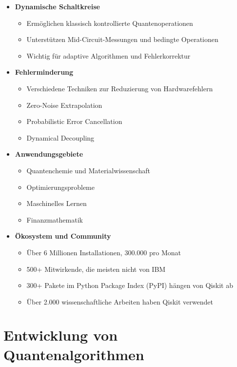 \begin{itemize}
    \item \textbf{Dynamische Schaltkreise}
    \begin{itemize}
        \item Ermöglichen klassisch kontrollierte Quantenoperationen
        \item Unterstützen Mid-Circuit-Messungen und bedingte Operationen
        \item Wichtig für adaptive Algorithmen und Fehlerkorrektur
    \end{itemize}
    
    \item \textbf{Fehlerminderung}
    \begin{itemize}
        \item Verschiedene Techniken zur Reduzierung von Hardwarefehlern
        \item Zero-Noise Extrapolation
        \item Probabilistic Error Cancellation
        \item Dynamical Decoupling
    \end{itemize}
    
    \item \textbf{Anwendungsgebiete}
    \begin{itemize}
        \item Quantenchemie und Materialwissenschaft
        \item Optimierungsprobleme
        \item Maschinelles Lernen
        \item Finanzmathematik
    \end{itemize}
    
    \item \textbf{Ökosystem und Community}
    \begin{itemize}
        \item Über 6 Millionen Installationen, 300.000 pro Monat
        \item 500+ Mitwirkende, die meisten nicht von IBM
        \item 300+ Pakete im Python Package Index (PyPI) hängen von Qiskit ab
        \item Über 2.000 wissenschaftliche Arbeiten haben Qiskit verwendet
    \end{itemize}
\end{itemize}



\section{Entwicklung von Quantenalgorithmen}

